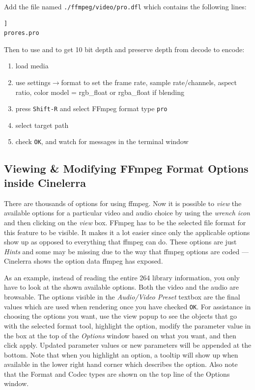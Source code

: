 Add the file named \texttt{./ffmpeg/video/pro.dfl} which contains the following lines:

\begin{lstlisting}[language=bash,numbers=none]]
prores.pro
\end{lstlisting}

Then to use and to get 10 bit depth and preserve depth from decode to encode:

\begin{enumerate}
    \item load media
    \item use settings$\rightarrow$format to set the frame rate, sample rate/channels, aspect ratio, 
    color model = rgb\_float or rgba\_float if blending
    \item press \texttt{Shift-R} and select FFmpeg format type \texttt{pro}
    \item select target path
    \item check \texttt{OK}, and watch for messages in the terminal window
\end{enumerate}

\subsection{Viewing \& Modifying FFmpeg Format Options inside Cinelerra}%
\label{sub:viewing_modifying_ffmpeg_cinelerra}

There are thousands of options for using ffmpeg.  Now it is possible to \textit{view} the available options for a particular video and audio choice by using the \textit{wrench icon} and then clicking on the \textit{view} box.  FFmpeg has to be the selected file format for this feature to be visible.  It makes it a lot easier since only the applicable options show up as opposed to everything that ffmpeg can do.  These options are just \textit{Hints} and some may be missing due to the way that ffmpeg options are coded --- Cinelerra shows the option data ffmpeg has exposed.

As an example, instead of reading the entire 264 library information, you only have to look at the shown available options.  Both the video and the audio are browsable. The options visible in the \textit{Audio/Video Preset} textbox are the final values which are used when rendering once you have checked \texttt{OK}.  For assistance in choosing the options you want, use the view popup to see the objects that go with the selected format tool, highlight the option, modify the parameter value in the box at the top of the \textit{Options} window based on what you want, and then click apply.  Updated parameter values or new parameters will be appended at the bottom.  Note that when you highlight an option, a tooltip will show up when available in the lower right hand corner which describes the option.  Also note that the Format and Codec types are shown on the top line of the Options window.

